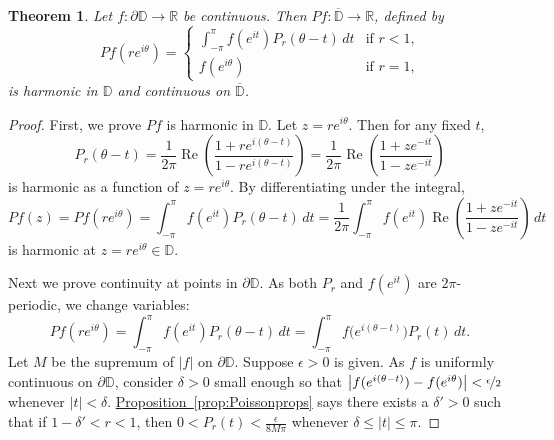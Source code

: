 \documentclass[12pt,openany]{book}
\renewcommand{\Re}{\operatorname{Re}}
\newcommand{\sabs}[1]{\lvert {#1} \rvert}
\newcommand{\babs}[1]{\bigl\lvert {#1} \bigr\rvert}
\newcommand{\R}{{\mathbb{R}}}
\newcommand{\D}{{\mathbb{D}}}
\theoremstyle{plain}
\newtheorem{thm}{Theorem}[section]
\theoremstyle{remark}
\theoremstyle{definition}
\theoremstyle{exercise}
\theoremstyle{example}
\newcommand{\propref}[1]{\hyperref[#1]{Proposition~\ref*{#1}}}
\begin{document}
\begin{thm} \label{thm:dirichsol}
Let $f \colon \partial \D \to \R$ be continuous.
Then
$Pf \colon \overline{\D} \to \R$, defined by
%
\begin{equation*}
Pf(re^{i\theta})
=
\begin{cases}
\int_{-\pi}^\pi f(e^{it}) P_{r}(\theta-t) \, dt
&
\text{if $r < 1$,} \\
f(e^{i\theta}) & \text{if $r=1$,}
\end{cases}
\end{equation*}
is harmonic in $\D$ and continuous on $\overline{\D}$.
\end{thm}

\begin{proof}
First, we prove $Pf$ is harmonic in $\D$.  Let $z = re^{i\theta}$.
Then for any fixed $t$,
\begin{equation*}
P_r(\theta-t)
=
\frac{1}{2\pi}
\Re
\left(
\frac{1+re^{i(\theta-t)}}{1-re^{i(\theta-t)}}
\right) 
=
\frac{1}{2\pi}
\Re
\left(
\frac{1+ze^{-it}}{1-ze^{-it}}
\right)
\end{equation*}
is harmonic as a function of $z=re^{i\theta}$.
By differentiating under the integral,
\begin{equation*}
Pf(z)
=
Pf(re^{i\theta})
=
\int_{-\pi}^\pi f(e^{it}) P_r(\theta-t) \, dt
=
\frac{1}{2\pi}
\int_{-\pi}^\pi f(e^{it}) 
\Re
\left(
\frac{1+z e^{-it}}{1-z e^{-it}}
\right) 
\, dt
\end{equation*}
is harmonic at $z = re^{i\theta} \in \D$.

Next we prove continuity at points in $\partial \D$.
As both $P_r$ and $f(e^{it})$ are $2 \pi$-periodic, we 
change variables:
\begin{equation*}
Pf(re^{i\theta})
=
\int_{-\pi}^\pi f(e^{it}) P_r(\theta-t) \, dt
=
\int_{-\pi}^\pi f\bigl(e^{i(\theta-t)}\bigr) P_r(t) \, dt .
\end{equation*}
Let $M$ be the supremum of
$\sabs{f}$ on $\partial \D$.  Suppose $\epsilon > 0$ is given.
As $f$ is uniformly continuous on $\partial \D$, consider $\delta > 0$
small enough so that $\babs{f(e^{i(\theta-t)})-f(e^{i\theta})} <
\nicefrac{\epsilon}{2}$ whenever $\sabs{t} < \delta$.
\propref{prop:Poissonprops} says there exists
a $\delta' > 0$ such that if  
$1-\delta' < r < 1$, then
$0 < P_r(t) < \frac{\epsilon}{8M\pi}$
whenever $\delta \leq \sabs{t} \leq \pi$.


\end{proof}
\end{document}
